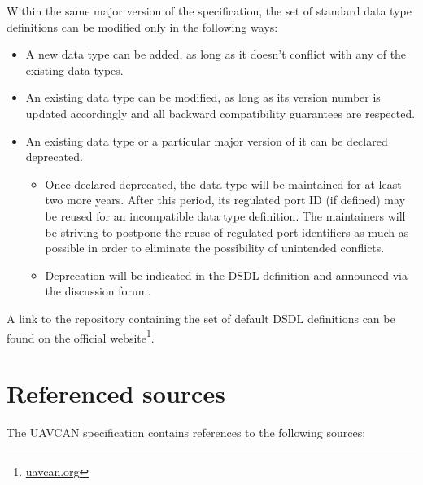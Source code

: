 Within the same major version of the specification,
the set of standard data type definitions can be modified only in the following ways:

\begin{itemize}
    \item A new data type can be added, as long as it doesn't conflict with any of the existing data types.

    \item An existing data type can be modified, as long as its version number is updated accordingly
    and all backward compatibility guarantees are respected.

    \item An existing data type or a particular major version of it can be declared deprecated.
    \begin{itemize}
        \item Once declared deprecated, the data type will be maintained for at least two more years.
        After this period, its regulated port ID (if defined) may be reused for an incompatible data type definition.
        The maintainers will be striving to postpone the reuse of regulated port identifiers as much as
        possible in order to eliminate the possibility of unintended conflicts.

        \item Deprecation will be indicated in the DSDL definition and announced via the discussion forum.
    \end{itemize}
\end{itemize}

A link to the repository containing the set of default DSDL definitions can be found on the official
website\footnote{\href{http://uavcan.org}{uavcan.org}}.

\section{Referenced sources}

The UAVCAN specification contains references to the following sources:

